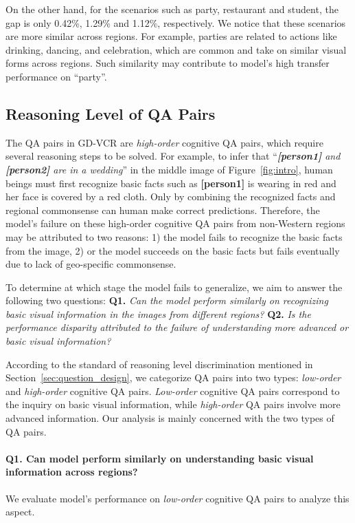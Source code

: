 \documentclass[11pt]{article}
\begin{document}
On the other hand, for the scenarios such as party, restaurant and student, the gap is only 0.42\%, 1.29\% and 1.12\%, respectively. We notice that these scenarios are more similar across regions. For example, parties are related to actions like drinking, dancing, and celebration, which are common and take on similar visual forms across regions. Such similarity may contribute to model's high transfer performance on ``party''.

\subsection{Reasoning Level of QA Pairs}
The QA pairs in GD-VCR are \emph{high-order} cognitive QA pairs, which require several reasoning steps to be solved. For example, to infer that ``\textit{\colorbox[rgb]{ .891,  .891,  .891}{\textbf{[person1]}} and \colorbox[rgb]{ .891,  .891,  .891}{\textbf{[person2]}} are in a wedding}'' in the middle image of Figure~\ref{fig:intro}, human beings must first recognize basic facts such as \colorbox[rgb]{ .891,  .891,  .891}{\textbf{[person1]}} is wearing in red and her face is covered by a red cloth. Only by combining the recognized facts and regional commonsense can human make correct predictions.
Therefore, the model's failure on these high-order cognitive QA pairs from non-Western regions may be attributed to two reasons: 1) the model fails to recognize the basic facts from the image, 2) or the model succeeds on the basic facts but fails eventually due to lack of geo-specific commonsense.

To determine at which stage the model fails to generalize, we aim to answer the following two questions: \textbf{Q1.} \emph{Can the model perform similarly on recognizing basic visual information in the images from different regions?} \textbf{Q2.} \emph{Is the performance disparity attributed to the failure of understanding more advanced or basic visual information?}

According to the standard of reasoning level discrimination mentioned in Section~\ref{sec:question_design}, we categorize QA pairs into two types: \emph{low-order} and \emph{high-order} cognitive QA pairs. \emph{Low-order} cognitive QA pairs correspond to the inquiry on basic visual information, while \emph{high-order} QA pairs involve more advanced information.
Our analysis is mainly concerned with the two types of QA pairs.

\paragraph{Q1. Can model perform similarly on understanding basic visual information across regions?}
We evaluate model's performance on \emph{low-order} cognitive QA pairs to analyze this aspect.
\end{document}
